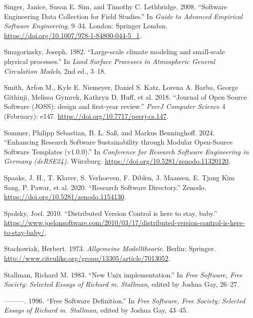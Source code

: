 \documentclass[preprint,11pt,5p]{elsarticle}
\newlength{\cslhangindent}
\newenvironment{CSLReferences}[2] %
{\begin{list}{}{%
	\setlength{\itemindent}{0pt}
	\setlength{\leftmargin}{0pt}
	\setlength{\parsep}{0pt}
	\ifodd #1
	\setlength{\leftmargin}{\cslhangindent}
	\setlength{\itemindent}{-1\cslhangindent}
	\fi
	\setlength{\itemsep}{#2\baselineskip}}}
{\end{list}}
\begin{document}
\begin{CSLReferences}{1}{0}
Singer, Janice, Susan E. Sim, and Timothy C. Lethbridge. 2008.
{``{Software Engineering Data Collection for Field Studies}.''} In
\emph{Guide to Advanced Empirical Software Engineering}, 9--34. London:
Springer London. \url{https://doi.org/10.1007/978-1-84800-044-5_1}.

Smagorinsky, Joseph. 1982. {``{Large-scale climate modeling and
small-scale physical processes}.''} In \emph{Land Surface Processes in
Atmospheric General Circulation Models}, 2nd ed., 3--18.

Smith, Arfon M., Kyle E. Niemeyer, Daniel S. Katz, Lorena A. Barba,
George Githinji, Melissa Gymrek, Kathryn D. Huff, et al. 2018.
{``{Journal of Open Source Software (JOSS): design and first-year
review}.''} \emph{PeerJ Computer Science} 4 (February): e147.
\url{https://doi.org/10.7717/peerj-cs.147}.

Sommer, Philipp Sebastian, B. L. Saß, and Markus Benninghoff. 2024.
{``{Enhancing Research Software Sustainability through Modular
Open-Source Software Templates (v1.0.0)}.''} In \emph{Conference for
Research Software Engineering in Germany (deRSE24)}. W{ü}rzburg.
\url{https://doi.org/10.5281/zenodo.11320120}.

Spaaks, J. H., T. Klaver, S. Verhoeven, F. Diblen, J. Maassen, E. Tjong
Kim Sang, P. Pawar, et al. 2020. {``{Research Software Directory}.''}
Zenodo. \url{https://doi.org/10.5281/zenodo.1154130}.

Spolsky, Joel. 2010. {``{Distributed Version Control is here to stay,
baby}.''}
\url{https://www.joelonsoftware.com/2010/03/17/distributed-version-control-is-here-to-stay-baby/}.

Stachowiak, Herbert. 1973. \emph{{Allgemeine Modelltheorie}}. Berlin:
Springer. \url{http://www.citeulike.org/group/13305/article/7013052}.

Stallman, Richard M. 1983. {``{New Unix implementation}.''} In
\emph{Free Software, Free Society: Selected Essays of Richard m.
Stallman}, edited by Joshua Gay, 26--27.

---------. 1996. {``{Free Software Definition}.''} In \emph{Free
Software, Free Society: Selected Essays of Richard m. Stallman}, edited
by Joshua Gay, 43--45.


\end{CSLReferences}
\end{document}
